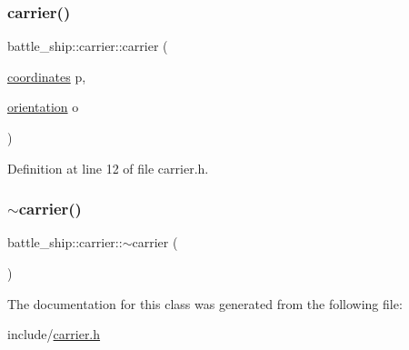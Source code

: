 \mbox{\label{classbattle__ship_1_1carrier_a3bb443575cd2f35ab21981b984c0fa02}} 
\subsubsection{\texorpdfstring{carrier()}{carrier()}\hspace{0.1cm}{\footnotesize\ttfamily [2/2]}}
{\footnotesize\ttfamily battle\+\_\+ship\+::carrier\+::carrier (\begin{DoxyParamCaption}\item[{\hyperlink{structbattle__ship_1_1coordinates}{coordinates}}]{p,  }\item[{\hyperlink{namespacebattle__ship_aed87488f0a73f0d0679fe343fb61c784}{orientation}}]{o }\end{DoxyParamCaption})\hspace{0.3cm}{\ttfamily [inline]}}



Definition at line 12 of file carrier.\+h.

\mbox{\label{classbattle__ship_1_1carrier_a3642e56afffedbe7e20af863d0dde697}} 
\subsubsection{\texorpdfstring{$\sim$carrier()}{~carrier()}}
{\footnotesize\ttfamily battle\+\_\+ship\+::carrier\+::$\sim$carrier (\begin{DoxyParamCaption}{ }\end{DoxyParamCaption})\hspace{0.3cm}{\ttfamily [default]}}



The documentation for this class was generated from the following file\+:\begin{DoxyCompactItemize}
\item 
include/\hyperlink{carrier_8h}{carrier.\+h}\end{DoxyCompactItemize}
